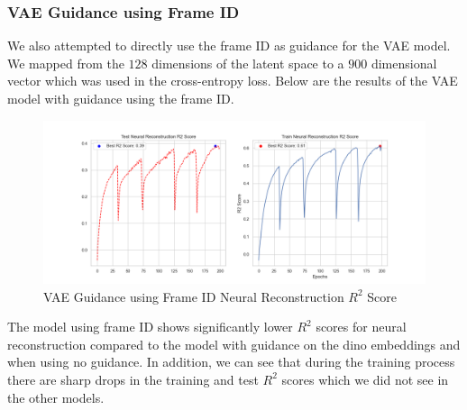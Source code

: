 \documentclass[12pt, letterpaper]{article}
\begin{document}
\subsubsection{VAE Guidance using Frame ID}
We also attempted to directly use the frame ID as guidance for the VAE model. We mapped from the $128$ dimensions of the latent space to a $900$ dimensional vector which was used in the cross-entropy loss. Below are the results of the VAE model with guidance using the frame ID.

\begin{figure}[H]
    \centering
    \includegraphics[width=1.0\textwidth]{x_r2_128dim_503_top_var_200_epochs_0.05_beta_2_layer_frame_id_guidance.png}
    \caption{VAE Guidance using Frame ID Neural Reconstruction $R^2$ Score}
    \label{fig:vae_guidance_frame_id}
\end{figure}

The model using frame ID shows significantly lower $R^2$ scores for neural reconstruction compared to the model with guidance on the dino embeddings and when using no guidance. In addition, we can see that during the training process there are sharp drops in the training and test $R^2$ scores which we did not see in the other models. 
\end{document}
